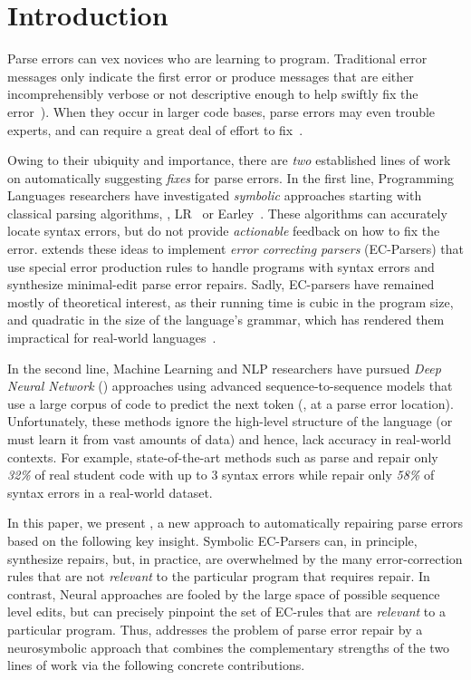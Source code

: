
\section{Introduction}
\label{sec:intro}

Parse errors can vex novices who
are learning to program.
%
Traditional error messages
only indicate the first error
or produce messages that
are either incomprehensibly
verbose or not descriptive
enough to help swiftly fix
the error~\citep{qian2017, VanDerSpek_2005}).
%
When they occur in larger code bases, parse errors
may even trouble experts, and can require a great deal of
effort to fix~\citep{Denny_2012, Ahadi_2018, Kummerfeld2003}.

Owing to their ubiquity and importance, there are \emph{two}
established lines of work on automatically suggesting \emph{fixes}
for parse errors.
%
In the first line, Programming Languages researchers
have investigated \emph{symbolic} approaches starting
with classical parsing algorithms, \eg, LR~\citep{Aho1974}
or Earley~\citep{Earley_1970}.
%
These algorithms can accurately locate syntax errors,
but do not provide \emph{actionable} feedback on how
to fix the error.
%
\citet{Aho_1972} extends these ideas to implement
\emph{error correcting parsers} (EC-Parsers) that
use special error production rules to handle
programs with syntax errors and 
synthesize minimal-edit parse error repairs.
%
Sadly, EC-parsers have remained mostly of theoretical
interest, as their running time is cubic in the 
program size, and quadratic in the size of the language's
grammar, which has rendered them impractical for 
real-world languages~\citep{McLean1996, Rajasekaran2014}.

In the second line, Machine Learning and NLP researchers have
pursued \emph{Deep Neural Network} (\dnn)
approaches using advanced sequence-to-sequence
models \citep{Sutskever_2014, Hardalov_2018}
that use a large corpus of code to predict
the next token (\eg, at a parse error location).
%
Unfortunately, these methods ignore the high-level structure
of the language (or must learn it from vast amounts
of data) and hence, lack accuracy in real-world contexts.
%
For example, state-of-the-art methods such as \citet{Ahmed_2021} parse and
repair only \emph{32\%} of real student code with up to 3 syntax errors
while \citet{Wu2020} repair only \emph{58\%} of syntax errors in a
real-world dataset.

In this paper, we present \toolname, a new approach
to automatically repairing parse errors
based on the following key insight.
%
Symbolic EC-Parsers \citep{Aho_1972} can, in principle,
synthesize repairs, but, in practice, are overwhelmed by
the many error-correction rules that are not \emph{relevant}
to the particular program that requires repair.
%
In contrast, Neural approaches are fooled by the large
space of possible sequence level edits, but can precisely
pinpoint the set of EC-rules that are \emph{relevant}
to a particular program.
%
Thus, \toolname addresses the problem of parse error
repair by a neurosymbolic approach that combines
the complementary strengths of the two lines of work
via the following concrete contributions.

